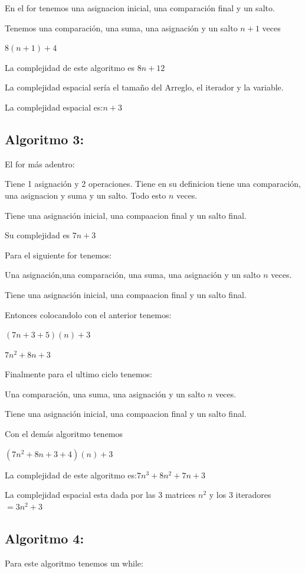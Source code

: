\documentclass[12pt, fleqn]{article}                             %
\theoremstyle{break}                                            %
\begin{document}
    En el for tenemos una asignacion inicial, una comparación final y un salto.

    Tenemos una comparación, una suma, una asignación y un salto $n+1$ veces

    $8(n+1)+4$

    La complejidad de este algoritmo es $8n+12$

    La complejidad espacial sería el tamaño del Arreglo, el iterador y la variable.

    La complejidad espacial es:$n+3$

    \subsection{Algoritmo 3:}
    
    El for más adentro: 

    Tiene 1 asignación y 2 operaciones.
    Tiene en su definicion tiene una comparación, una asignacion y suma y un salto. Todo esto $n$ veces.

    Tiene una asignación inicial, una compaacion final y un salto final.

    Su complejidad es $7n+3$

    Para el siguiente for tenemos:

    Una asignación,una comparación, una suma, una asignación y un salto $n$ veces.

    Tiene una asignación inicial, una compaacion final y un salto final.

    Entonces colocandolo con el anterior tenemos:

    $(7n+3+5)(n)+3$

    $7n^{2}+8n+3$

    Finalmente para el ultimo ciclo tenemos:

    Una comparación, una suma, una asignación y un salto $n$ veces.

    Tiene una asignación inicial, una compaacion final y un salto final.

    Con el demás algoritmo tenemos

    $(7n^{2}+8n+3+4)(n)+3$

    La complejidad de este algoritmo es:$7n^{3}+8n^{2}+7n+3$

    La complejidad espacial esta dada por las 3 matrices $n^{2}$ y los 3 iteradores$=3n^{2}+3$

    \subsection{Algoritmo 4:}
    
    Para este algoritmo tenemos un while:
\end{document}
